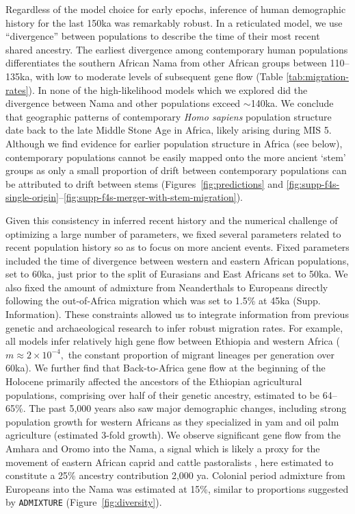 \documentclass[]{article}
\begin{document}
Regardless of the model choice for early epochs, inference of human demographic
history for the last 150ka was remarkably robust.
In a reticulated model, we use ``divergence'' between populations to describe
the time of their most recent shared ancestry.
The earliest divergence among
contemporary human populations differentiates the southern African Nama from
other African groups between 110--135ka, with low to moderate levels of
subsequent gene flow (Table \ref{tab:migration-rates}). In none of the
high-likelihood models which we explored did the divergence between Nama and
other populations exceed $\sim$140ka. 
We conclude that geographic patterns of contemporary \emph{Homo sapiens} population structure
date back to the late Middle Stone Age in Africa, likely arising during MIS 5.
Although we find evidence for earlier population structure in Africa (see
below), contemporary populations cannot be easily mapped onto the more ancient
`stem' groups as only a small proportion of drift between contemporary populations can
be attributed to drift between stems (Figures~\ref{fig:predictions} and
\ref{fig:supp-f4s-single-origin}--\ref{fig:supp-f4s-merger-with-stem-migration}). 

Given this consistency in inferred recent history and the numerical challenge
of optimizing a large number of parameters, we fixed several parameters related
to recent population history so as to focus on more ancient events. 
Fixed parameters included
the time of divergence between western and eastern African populations,
set to 60ka, just prior to the split of Eurasians and East Africans set to 50ka. 
We also fixed the amount of admixture from Neanderthals to Europeans directly
following the out-of-Africa migration which was set to 1.5\% at 45ka (Supp. Information).
These constraints allowed us to integrate information from previous genetic
and archaeological research to infer robust migration rates.
For example, all models infer relatively high gene flow between Ethiopia and western Africa
($m\approx2\times10^{-4},$ the constant proportion of migrant lineages per generation over 60ka).
We further find that Back-to-Africa gene flow at the beginning of the Holocene primarily
affected the ancestors of the Ethiopian agricultural populations, comprising
over half of their genetic ancestry, estimated to be 64--65\%. The past 5,000
years also saw major demographic changes, including strong population growth
for western Africans as they specialized in yam and oil palm agriculture
(estimated 3-fold growth). We observe significant gene flow from the Amhara and
Oromo into the Nama, a signal which is likely a proxy for the movement of
eastern African caprid and cattle pastoralists
\citep{Henn2008-xo,Breton2014-xb}, here estimated to constitute a 25\% ancestry
contribution 2,000 ya. Colonial period admixture from Europeans into the Nama
was estimated at 15\%, similar to proportions suggested by \texttt{ADMIXTURE}
(Figure~\ref{fig:diversity}).
\end{document}
